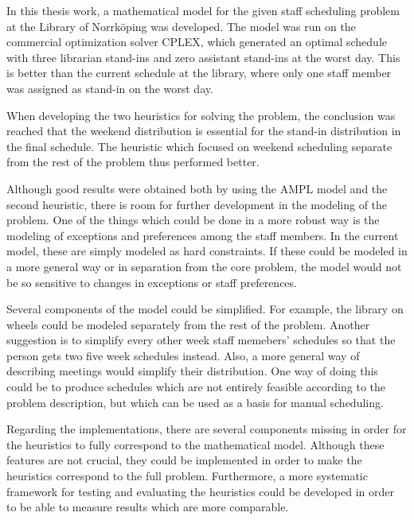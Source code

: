 In this thesis work, a mathematical model for the given staff scheduling problem at the Library of Norrköping was developed. The model was run on the commercial optimization solver CPLEX, which generated an optimal schedule with three librarian stand-ins and zero assistant stand-ins at the worst day. This is better than the current schedule at the library, where only one staff member was assigned as stand-in on the worst day.

When developing the two heuristics for solving the problem, the conclusion was reached that the weekend distribution is essential for the stand-in distribution in the final schedule. The heuristic which focused on weekend scheduling separate from the rest of the problem thus performed better. 

Although good results were obtained both by using the AMPL model and the second heuristic, there is room for further development in the modeling of the problem. One of the things which could be done in a more robust way is the modeling of exceptions and preferences among the staff members. In the current model, these are simply modeled as hard constraints. If these could be modeled in a more general way or in separation from the core problem, the model would not be so sensitive to changes in exceptions or staff preferences.

Several components of the model could be simplified. For example, the library on wheels could be modeled separately from the rest of the problem. Another suggestion is to simplify every other week staff memebers' schedules so that the person gets two five week schedules instead. Also, a more general way of describing meetings would simplify their distribution. One way of doing this could be to produce schedules which are not entirely feasible according to the problem description, but which can be used as a basis for manual scheduling.

Regarding the implementations, there are several components missing in order for the heuristics to fully correspond to the mathematical model. Although these features are not crucial, they could be implemented in order to make the heuristics correspond to the full problem. Furthermore, a more systematic framework for testing and evaluating the heuristics could be developed in order to be able to measure results which are more comparable.




